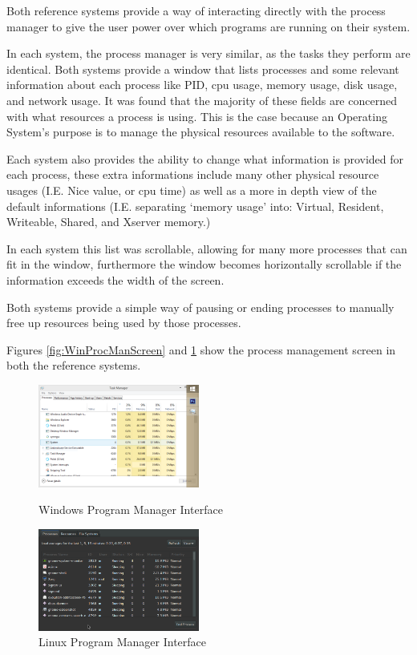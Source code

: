 \documentclass[a4paper]{report}
\begin{document}
Both reference systems provide a way of interacting directly with the process manager to give the user power over which programs are running on their system.

In each system, the process manager is very similar, as the tasks they perform are identical. Both systems provide a window that lists processes and some relevant information about each process like PID, cpu usage, memory usage, disk usage, and network usage. It was found that the majority of these fields are concerned with what resources a process is using. This is the case because an Operating System's purpose is to manage the physical resources available to the software.

Each system also provides the ability to change what information is provided for each process, these extra informations include many other physical resource usages (I.E. Nice value, or cpu time) as well as a more in depth view of the default informations (I.E. separating `memory usage' into: Virtual, Resident, Writeable, Shared, and Xserver memory.)

In each system this list was scrollable, allowing for many more processes that can fit in the window, furthermore the window becomes horizontally scrollable if the information exceeds the width of the screen.

Both systems provide a simple way of pausing or ending processes to manually free up resources being used by those processes.

Figures \ref{fig:WinProcManScreen} and \ref{fig:LinProcManScreen} show the process management screen in both the reference systems.

\begin{figure}[ht]
\centering
\begin{minipage}{.5\textwidth}
  \centering
  \includegraphics[width=200px]{images/Windows_Program_Manager_Screenshot}
  \caption{Windows Program Manager Interface}
  \label{fig:WinProcManScreen}
\end{minipage}%
\begin{minipage}{.5\textwidth}
  \centering
  \includegraphics[width=200px]{images/Linux_Program_Manager_Screenshot}
  \caption{Linux Program Manager Interface}
  \label{fig:LinProcManScreen}
\end{minipage}
\end{figure}
\end{document}
